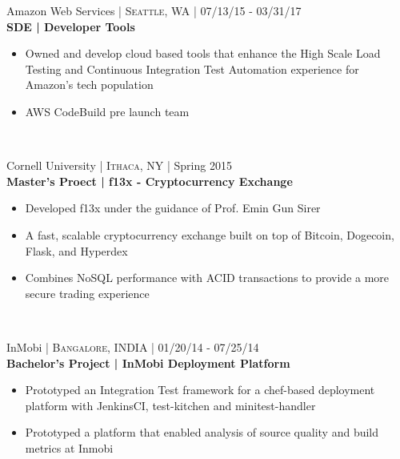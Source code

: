 \documentclass[10pt]{article} %
\begin{document}
{\begin{minipage}[t]{0.57\textwidth}
{\raggedright\large Amazon Web Services \normalsize\textsc{ | Seattle, WA} | 07/13/15 - 03/31/17\\
\textbf{SDE | Developer Tools}\\[5pt]}
\vspace{0pt}
\begin{itemize}\itemsep-0.25em
    \item Owned and develop cloud based tools that enhance the High Scale Load Testing and Continuous Integration Test Automation experience for Amazon's tech population
    \item AWS CodeBuild pre launch team
\end{itemize}\\

{\raggedright\large Cornell University \normalsize\textsc{ | Ithaca, NY} | Spring 2015\\
\textbf{Master's Proect | f13x - Cryptocurrency Exchange }\\[5pt]}
\begin{itemize}\itemsep-0.25em
    \item Developed f13x under the guidance of Prof. Emin Gun Sirer
    \item A fast, scalable cryptocurrency exchange built on top of Bitcoin, Dogecoin, Flask, and Hyperdex
    \item Combines NoSQL performance with ACID transactions to provide a more secure trading experience
\end{itemize}\\




{\raggedright\large InMobi \normalsize\textsc{ | Bangalore, INDIA} | 01/20/14 - 07/25/14\\
\textbf{Bachelor's Project | InMobi Deployment Platform }\\[5pt]}
\vspace{0pt}
\begin{itemize}\itemsep-0.25em
    \item Prototyped an Integration Test framework for a chef-based deployment platform with JenkinsCI, test-kitchen and minitest-handler
    \item Prototyped a platform that enabled analysis of source quality and build metrics at Inmobi
\end{itemize}\\


\end{minipage}}
\end{document}
